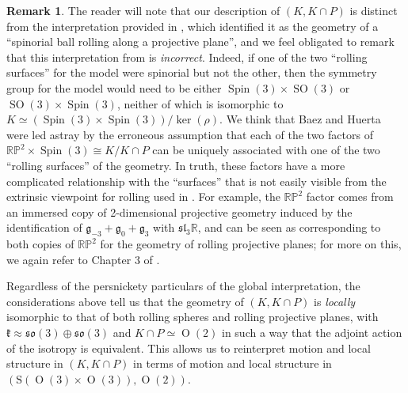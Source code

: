 \documentclass[12pt,a4paper]{amsart}
\theoremstyle{definition}
\newtheorem{remark}[theorem]{Remark}
\DeclareMathOperator{\Orth}{O}
\DeclareMathOperator{\SOrth}{SO}
\DeclareMathOperator{\Spin}{Spin}
\begin{document}
\begin{remark}The reader will note that our description of $(K,K\cap P)$ is distinct from the interpretation provided in \cite{BaezHuerta2014}, which identified it as the geometry of a ``spinorial ball rolling along a projective plane'', and we feel obligated to remark that this interpretation from \cite{BaezHuerta2014} is \textit{incorrect}. Indeed, if one of the two ``rolling surfaces'' for the model were spinorial but not the other, then the symmetry group for the model would need to be either $\Spin(3)\times\SOrth(3)$ or $\SOrth(3)\times\Spin(3)$, neither of which is isomorphic to $K\simeq(\Spin(3)\times\Spin(3))/\ker(\rho)$. We think that Baez and Huerta were led astray by the erroneous assumption that each of the two factors of $\mathbb{RP}^2\times\Spin(3)\cong K/K\cap P$ can be uniquely associated with one of the two ``rolling surfaces'' of the geometry. In truth, these factors have a more complicated relationship with the ``surfaces'' that is not easily visible from the extrinsic viewpoint for rolling used in \cite{BaezHuerta2014}. For example, the $\mathbb{RP}^2$ factor comes from an immersed copy of 2-dimensional projective geometry induced by the identification of $\mathfrak{g}_{-3}+\mathfrak{g}_0+\mathfrak{g}_3$ with $\mathfrak{sl}_3\mathbb{R}$, and can be seen as corresponding to both copies of $\mathbb{RP}^2$ for the geometry of rolling projective planes; for more on this, we again refer to Chapter 3 of \cite{EricksonThesis}.\end{remark}

Regardless of the persnickety particulars of the global interpretation, the considerations above tell us that the geometry of $(K,K\cap P)$ is \textit{locally} isomorphic to that of both rolling spheres and rolling projective planes, with $\mathfrak{k}\approx\mathfrak{so}(3)\oplus\mathfrak{so}(3)$ and $K\cap P\simeq\Orth(2)$ in such a way that the adjoint action of the isotropy is equivalent. This allows us to reinterpret motion and local structure in $(K,K\cap P)$ in terms of motion and local structure in $(\mathrm{S}(\Orth(3)\times\Orth(3)),\Orth(2))$.
\end{document}
